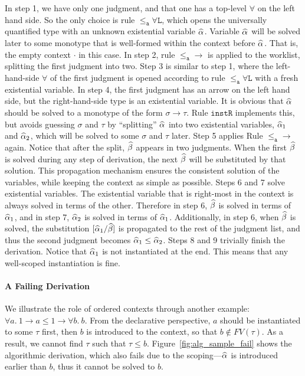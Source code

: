 In step 1, we have only one judgment, and that one has a top-level $\forall$ on
the left hand side. So the only choice is rule $\mathtt{{\le_a}\forall L}$, which
opens the universally quantified type with an unknown existential variable
$\al$. Variable $\al$ will be solved later to some monotype that is well-formed
within the context before $\al$. That is, the empty context $\cdot$ in this
case.
In step 2, rule $\mathtt{{\le_a}{\to}}$ is applied to the worklist,
splitting the first judgment into two.
Step 3 is similar to step 1, where the left-hand-side $\forall$ of the first
judgment is opened according to rule $\mathtt{{\le_a}\forall L}$ with a fresh
existential variable.
In step 4, the first judgment has an arrow on the left hand side, but the
right-hand-side type is an existential variable. It is obvious
that $\al$ should be solved to a monotype of the form
$\sigma \to \tau$. Rule $\mathtt{instR}$ implements this, but avoids
guessing $\sigma$ and $\tau$ by ``splitting'' $\al$ into two existential
variables, $\al[1]$ and $\al[2]$, which will be solved to some $\sigma$ and
$\tau$ later.
Step 5 applies Rule $\mathtt{{\le_a}{\to}}$ again. Notice that after the
split, $\bt$ appears in two judgments. When the first $\bt$ is solved
during any step of derivation, the next $\bt$ will be substituted by that
solution.  This propagation mechanism ensures the consistent solution of the
variables, while keeping the context as simple as possible.
Steps 6 and 7 solve existential variables. The existential
variable that is right-most in the context is always solved in terms of the other. Therefore in step 6,
$\bt$ is solved in terms of $\al[1]$, and in step 7, $\al[2]$ is solved in terms of $\al[1]$.
Additionally, in step 6, when $\bt$ is solved, the substitution $[\al[1] /
\bt]$ is propagated to the rest of the judgment list, and thus the second
judgment becomes $\al[1]\le\al[2]$.
Steps 8 and 9 trivially finish the derivation. Notice that $\al[1]$ is not
instantiated at the end. This means that any well-scoped instantiation is fine.

\paragraph{A Failing Derivation} We illustrate the role of ordered contexts through another example: $\forall a.\ 1\to a \le 1\to \forall b.\ b$. From the declarative perspective, $a$ should be instantiated to some $\tau$ first, then $b$ is introduced to the context, so that $b\notin FV(\tau)$. As a result, we cannot find $\tau$ such that $\tau \le b$. Figure~\ref{fig:alg_sample_fail} shows the algorithmic derivation, which also fails due to the scoping---$\al$ is introduced earlier than $b$, thus it cannot be solved to $b$.





